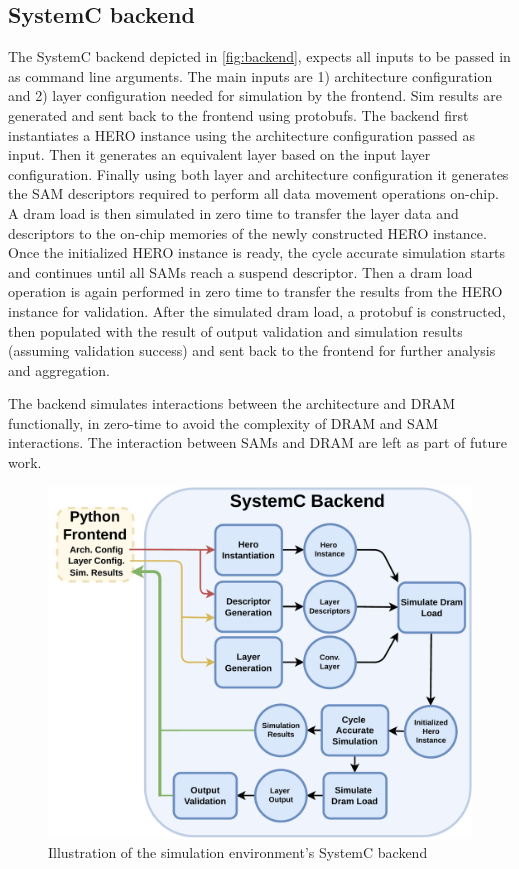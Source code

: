 \subsection{SystemC backend}
\label{chap:hero:sim_platform:backend}

The SystemC backend depicted in \autoref{fig:backend}, expects all inputs to be passed in as command line
arguments. The main inputs are 1) architecture configuration and 2) layer
configuration needed for simulation by the frontend. Sim results are generated
and sent back to the frontend using protobufs. The backend first instantiates a
HERO instance using the architecture configuration passed as input. Then it
generates an equivalent layer based on the input layer configuration. Finally
using both layer and architecture configuration it generates the SAM descriptors
required to perform all data movement operations on-chip. A dram load is then
simulated in zero time to transfer the layer data and descriptors to the on-chip
memories of the newly constructed HERO instance. Once the initialized HERO
instance is ready, the cycle accurate simulation starts and continues until all
SAMs reach a suspend descriptor. Then a dram load operation is again performed
in zero time to transfer the results from the HERO instance for validation.
After the simulated dram load, a protobuf is constructed, then populated with
the result of output validation and simulation results (assuming validation
success) and sent back to the frontend for further analysis and aggregation. 

The backend simulates interactions between the architecture and DRAM
functionally, in zero-time to avoid the complexity of DRAM and SAM interactions.
The interaction between SAMs and DRAM are left as part of future work. 

\begin{figure}[ht]
    \centering
    \includegraphics[scale=0.5]{fig/hero-sim-backend.pdf}
    \caption{Illustration of the simulation environment's SystemC backend}
    \label{fig:backend}
\end{figure}

